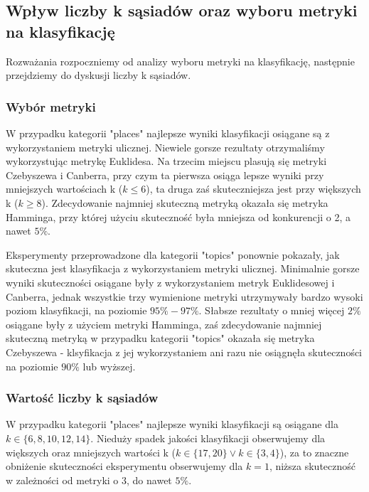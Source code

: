 \documentclass{classrep}
\begin{document}
\subsection{Wpływ liczby k sąsiadów oraz wyboru metryki na klasyfikację}
Rozważania rozpoczniemy od analizy wyboru metryki na klasyfikację, następnie przejdziemy do dyskusji liczby k sąsiadów.

\subsubsection{Wybór metryki}
W przypadku kategorii "places" najlepsze wyniki klasyfikacji osiągane są z wykorzystaniem metryki ulicznej. Niewiele gorsze rezultaty otrzymaliśmy wykorzystując metrykę Euklidesa. Na trzecim miejscu plasują się metryki Czebyszewa i Canberra, przy czym ta pierwsza osiąga lepsze wyniki przy mniejszych wartościach k ($k\leq6$), ta druga zaś skuteczniejsza jest przy większych k ($k\geq8$). Zdecydowanie najmniej skuteczną metryką okazała się metryka Hamminga, przy której użyciu skuteczność była mniejsza od konkurencji o 2, a nawet $5\%$. \newline

Eksperymenty przeprowadzone dla kategorii "topics" ponownie pokazały, jak skuteczna jest klasyfikacja z wykorzystaniem metryki ulicznej. Minimalnie gorsze wyniki skuteczności osiągane były z wykorzystaniem metryk Euklidesowej i Canberra, jednak wszystkie trzy wymienione metryki utrzymywały bardzo wysoki poziom klasyfikacji, na poziomie $95\%-97\%$. Słabsze rezultaty o mniej więcej $2\%$ osiągane były z użyciem metryki Hamminga, zaś zdecydowanie najmniej skuteczną metryką w przypadku kategorii "topics" okazała się metryka Czebyszewa - klsyfikacja z jej wykorzystaniem ani razu nie osiągnęła skuteczności na poziomie $90\%$ lub wyższej. \newline

\subsubsection{Wartość liczby k sąsiadów}
W przypadku kategorii "places" najlepsze wyniki klasyfikacji są osiągane dla $k \in \{6, 8, 10, 12, 14\}$. Nieduży spadek jakości klasyfikacji obserwujemy dla większych oraz mniejszych wartości k ($k\in \{17, 20\} \lor k \in \{3, 4\}$), za to znaczne obniżenie skuteczności eksperymentu obserwujemy dla $k=1$, niższa skuteczność w zależności od metryki o 3, do nawet $5\%$. \newline
\end{document}
